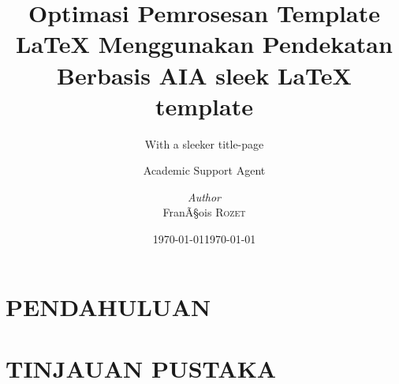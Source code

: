 \documentclass{report}
\title{Optimasi Pemrosesan Template LaTeX Menggunakan Pendekatan Berbasis AI}
\author{Academic Support Agent}
\date{\today}
\begin{document}
\maketitle

\begin{abstract}

\end{abstract}

\chapter{PENDAHULUAN}


\chapter{TINJAUAN PUSTAKA}




\usepackage[english]{babel}
\usepackage[noheader]{packages/sleek}
\usepackage{packages/sleek-title}
\usepackage{packages/sleek-theorems}
\usepackage{packages/sleek-listings}


\title{A sleek \LaTeX{} template}
\subtitle{With a sleeker title-page}
\author{\textit{Author}\\FranÃ§ois \textsc{Rozet}}
\date{\today}







\def\tbs{\textbackslash}

\end{document}
